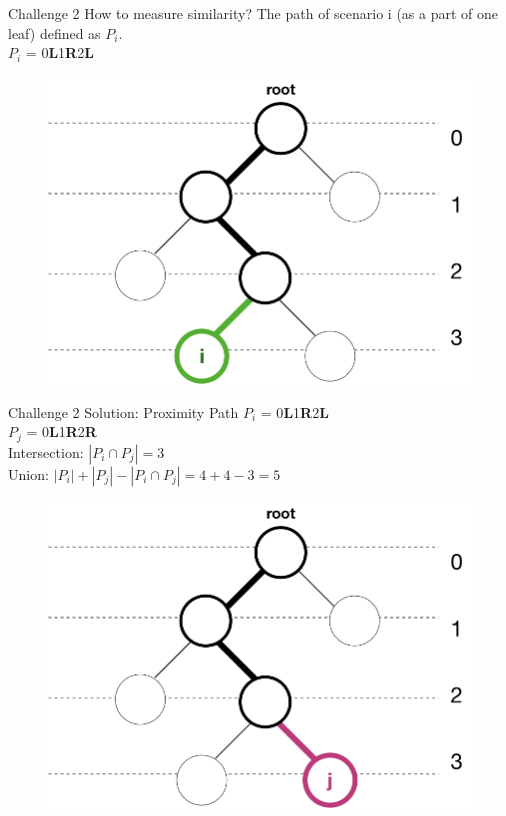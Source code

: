 \documentclass[shortpres]{beamer}
\begin{document}
  \begin{frame}{Challenge 2 How to measure similarity?}	
    The path of scenario i (as a part of one leaf) defined as $P_i$.\\
    $P_i$ = 0\textbf{L}1\textbf{R}2\textbf{L}
    \begin{figure}
      \includegraphics[height=0.6\textheight]{fig/ppath.png}
    \end{figure}
  \end{frame}
  \begin{frame}{Challenge 2 Solution: Proximity Path}
    $P_i$ = 0\textbf{L}1\textbf{R}2\textbf{L}\\
    $P_j$ = 0\textbf{L}1\textbf{R}2\textbf{R}\\
    Intersection: $|P_i \cap P_j| = 3$ \\
    Union: $|P_i|+ |P_j|-|P_i \cap P_j| = 4+4-3 = 5$
    \begin{figure}
      \includegraphics[height=0.6\textheight]{fig/ppath2.png}
    \end{figure}
  \end{frame}
\end{document}
